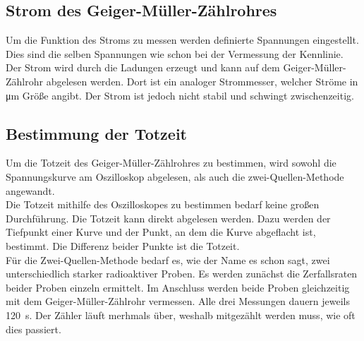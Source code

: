 \subsection{Strom des Geiger-Müller-Zählrohres}
Um die Funktion des Stroms zu messen werden definierte Spannungen eingestellt. Dies sind die selben Spannungen wie schon bei der 
Vermessung der Kennlinie. Der Strom wird durch die Ladungen erzeugt und kann auf dem Geiger-Müller-Zählrohr abgelesen werden. Dort 
ist ein analoger Strommesser, welcher Ströme in \unit{\micro\meter} Größe angibt. Der Strom ist jedoch nicht stabil und schwingt 
zwischenzeitig.

\subsection{Bestimmung der Totzeit}
Um die Totzeit des Geiger-Müller-Zählrohres zu bestimmen, wird sowohl die Spannungskurve am Oszilloskop abgelesen, als auch 
die zwei-Quellen-Methode angewandt. \\
\noindent Die Totzeit mithilfe des Oszilloskopes zu bestimmen bedarf keine großen Durchführung. Die Totzeit kann direkt abgelesen werden. 
Dazu werden der Tiefpunkt einer Kurve und der Punkt, an dem die Kurve abgeflacht ist, bestimmt. Die Differenz beider Punkte ist die Totzeit. \\
\noindent Für die Zwei-Quellen-Methode bedarf es, wie der Name es schon sagt, zwei unterschiedlich starker radioaktiver Proben. Es werden 
zunächst die Zerfallsraten beider Proben einzeln ermittelt. Im Anschluss werden beide Proben gleichzeitig mit dem Geiger-Müller-Zählrohr 
vermessen. Alle drei Messungen dauern jeweils \qty{120}{\second}.
Der Zähler läuft merhmals über, weshalb mitgezählt werden muss, wie oft dies passiert.




